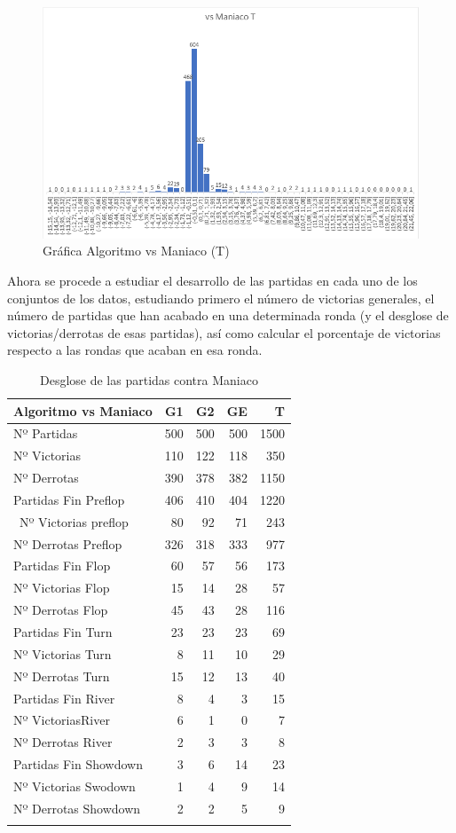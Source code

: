 \begin{figure}[h]
\centering
\includegraphics[width=.6\textwidth]{figuras/AvMT.png}   
\caption{Gráfica Algoritmo vs Maniaco (T)}
\label{fig:AvMGT}
\end{figure}

\vspace{5mm} %

Ahora se procede a estudiar el desarrollo de las partidas en cada uno de los conjuntos de los datos, estudiando primero el número de victorias generales, el número de partidas que han acabado en una determinada ronda (y el desglose de victorias/derrotas de esas partidas), así como calcular el porcentaje de victorias respecto a las rondas que acaban en esa ronda.

\vspace{5mm} %

\begin{longtable}[c]{lrrrr}
\hline
Algoritmo vs Maniaco & G1 & G2 & GE & T \\ \hline
Nº Partidas & 500 & 500 & 500 & 1500 \\ 
Nº Victorias & 110 & 122 & 118 & 350 \\ 
Nº Derrotas & 390 & 378 & 382 & 1150 \\ 
Partidas Fin Preflop & 406 & 410 & 404 & 1220 \\ \
Nº Victorias preflop & 80 & 92 & 71 & 243 \\ 
Nº Derrotas Preflop & 326 & 318 & 333 & 977 \\ 
Partidas Fin Flop & 60 & 57 & 56 & 173 \\ 
Nº Victorias Flop & 15 & 14 & 28 & 57 \\ 
Nº Derrotas Flop & 45 & 43 & 28 & 116 \\ 
Partidas Fin Turn & 23 & 23 & 23 & 69 \\ 
Nº Victorias Turn & 8 & 11 & 10 & 29 \\ 
Nº Derrotas Turn & 15 & 12 & 13 & 40 \\ 
Partidas Fin River & 8 & 4 & 3 & 15 \\ 
Nº VictoriasRiver & 6 & 1 & 0 & 7 \\ 
Nº Derrotas River & 2 & 3 & 3 & 8 \\ 
Partidas Fin Showdown & 3 & 6 & 14 & 23 \\ 
Nº Victorias Swodown & 1 & 4 & 9 & 14 \\ 
Nº Derrotas Showdown & 2 & 2 & 5 & 9 \\ \hline
\caption{Desglose de las partidas contra Maniaco}
\label{tab:PlaysM}
\end{longtable}

